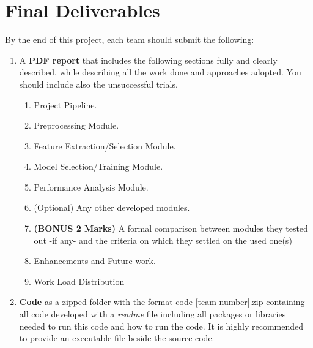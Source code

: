 \documentclass[12pt]{article}
\begin{document}
\section{Final Deliverables}
By the end of this project, each team should submit the following:
\begin{enumerate}
    \item A \textbf{PDF report} that includes the following sections fully and clearly described, while describing all the work done and approaches adopted. You should include also the unsuccessful trials.
    \begin{enumerate}
        \item Project Pipeline.
        \item Preprocessing Module.
        \item Feature Extraction/Selection Module.
        \item Model Selection/Training Module. 
        \item Performance Analysis Module. 
        \item (Optional) Any other developed modules. 
        \item \textbf{(BONUS 2 Marks)} A formal comparison between modules they tested out -if any- and the criteria on which they settled on the used one(s)
        \item Enhancements and Future work.
        \item Work Load Distribution
    \end{enumerate}
    
    
\item \textbf{Code} as a zipped folder with the format code [team number].zip containing all code
developed with a \textit{readme} file including all packages or libraries needed to run
this code and how to run the code. It is highly recommended to provide an executable file beside the source code.
\end{enumerate}
\end{document}
